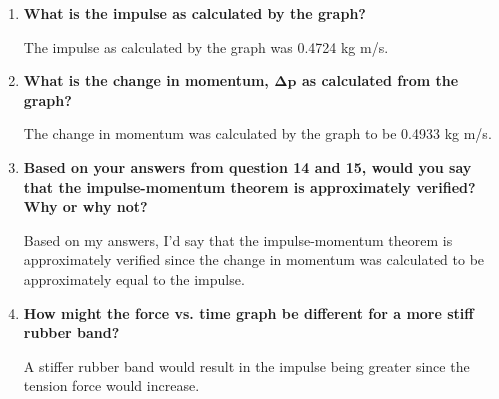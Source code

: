 \begin{enumerate}
\item \textbf{What is the impulse as calculated by the graph?}

The impulse as calculated by the graph was 0.4724 kg m/s.

\item \textbf{What is the change in momentum, $\mathbf{\Delta{p}}$ as calculated from the graph?}

The change in momentum was calculated by the graph to be 0.4933 kg m/s.

\item \textbf{Based on your answers from question 14 and 15, would you say that the impulse-momentum theorem is approximately verified? Why or why not?}

Based on my answers, I'd say that the impulse-momentum theorem is approximately verified since the change in momentum was calculated to be approximately equal to the impulse.

\item \textbf{How might the force vs. time graph be different for a more stiff rubber band?}

A stiffer rubber band would result in the impulse being greater since the tension force would increase.

\end{enumerate}

